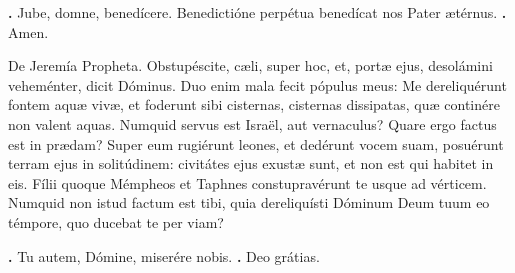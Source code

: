 \begin{small}
\textbf{\Vbar.} Jube, domne, benedícere.
Benedictióne perpétua benedícat nos Pater ætérnus. \textbf{\Rbar.} Amen.
\end{small}


De Jeremía Propheta. 
Obstupéscite, cæli, super hoc, et, portæ ejus, desolámini veheménter, dicit Dóminus.
Duo enim mala fecit pópulus meus: Me dereliquérunt fontem aquæ vivæ, et foderunt sibi cisternas, cisternas dissipatas, quæ continére non valent aquas.
Numquid servus est Israël, aut vernaculus? Quare ergo factus est in prædam?
Super eum rugiérunt leones, et dedérunt vocem suam, posuérunt terram ejus in solitúdinem: civitátes ejus exustæ sunt, et non est qui habitet in eis.
Fílii quoque Mémpheos et Taphnes constupravérunt te usque ad vérticem.
Numquid non istud factum est tibi, quia dereliquísti Dóminum Deum tuum eo témpore, quo ducebat te per viam?

\textbf{\Vbar.} Tu autem, Dómine, miserére nobis.
\textbf{\Rbar.} Deo grátias.


